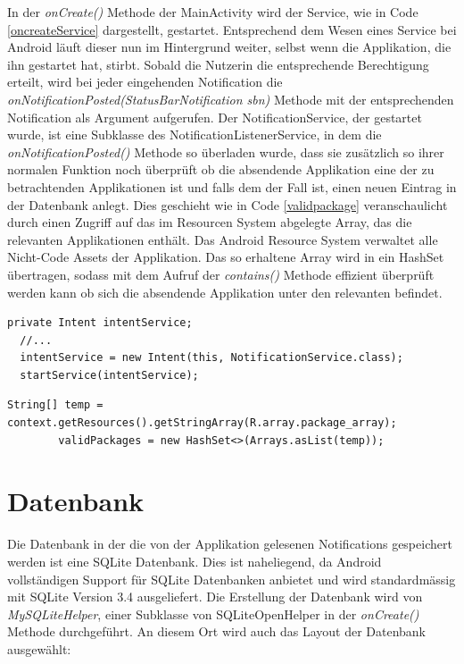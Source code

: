In der \emph{onCreate()} Methode der MainActivity wird der Service, wie in Code \ref{oncreateService} dargestellt, gestartet.
Entsprechend dem Wesen eines Service bei Android läuft dieser nun im Hintergrund weiter, selbst wenn die Applikation, die ihn gestartet hat, stirbt.
Sobald die Nutzerin die entsprechende Berechtigung erteilt, wird bei jeder eingehenden Notification die \emph{onNotificationPosted(StatusBarNotification sbn)} Methode mit der entsprechenden Notification als Argument aufgerufen.
Der NotificationService, der gestartet wurde, ist eine Subklasse des NotificationListenerService, in dem die  \emph{onNotificationPosted()} Methode so überladen wurde,
dass sie zusätzlich so ihrer normalen Funktion noch überprüft ob die absendende Applikation eine der zu betrachtenden Applikationen ist und falls dem der Fall ist, einen neuen Eintrag in der Datenbank anlegt.
Dies geschieht wie in Code \ref{validpackage} veranschaulicht durch einen Zugriff auf das im Resourcen System abgelegte Array, das die relevanten Applikationen enthält. 
Das Android Resource System verwaltet alle Nicht-Code Assets der Applikation.
Das so erhaltene Array wird in ein HashSet übertragen, sodass mit dem Aufruf der \emph{contains()} Methode effizient überprüft werden kann ob sich die absendende Applikation unter den relevanten befindet.


\begin{lstlisting}[frame=single, caption = startService(), label=oncreateService] 
  private Intent intentService;
  //...
  intentService = new Intent(this, NotificationService.class);
  startService(intentService);
\end{lstlisting}

\begin{lstlisting}[frame=single, caption = Package Überprüfung, label=validpackage] 
String[] temp = context.getResources().getStringArray(R.array.package_array);
        validPackages = new HashSet<>(Arrays.asList(temp));
\end{lstlisting}



\section{Datenbank}

Die Datenbank in der die von der Applikation gelesenen Notifications gespeichert werden ist eine SQLite Datenbank.
Dies ist naheliegend, da Android vollständigen Support für SQLite Datenbanken anbietet und wird standardmässig mit SQLite Version 3.4 ausgeliefert.
Die Erstellung der Datenbank wird von \emph{MySQLiteHelper}, einer Subklasse von SQLiteOpenHelper in der \emph{onCreate()} Methode durchgeführt.
An diesem Ort wird auch das Layout der Datenbank ausgewählt:

